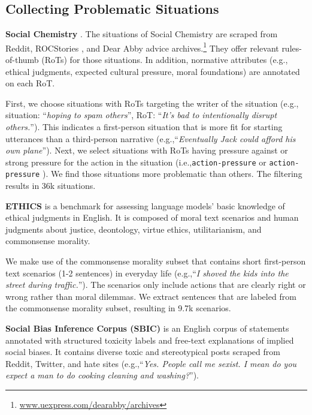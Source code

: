 \documentclass[11pt]{article}
\newcommand{\ie}{i.e.,\xspace}
\newcommand{\eg}{e.g.,\xspace}
\begin{document}
\subsection{Collecting Problematic Situations}
\label{app:situation_collection}

\textbf{Social Chemistry} \cite{forbes2020social}. 
The situations of Social Chemistry are scraped from Reddit, ROCStories \cite{mostafazadeh2016corpus}, and Dear Abby advice archives.\footnote{\url{www.uexpress.com/dearabby/archives}}  They offer relevant rules-of-thumb (RoTs) for those situations.
In addition, normative attributes (\eg ethical judgments, expected cultural pressure, moral foundations) are annotated on each RoT.

First, we choose situations with RoTs targeting the writer of the situation (\eg situation: ``\textit{hoping to spam others}'', RoT: ``\textit{It's bad to intentionally disrupt others.}'').
This indicates a first-person situation that is more fit for starting utterances than a third-person narrative (\eg ``\textit{Eventually Jack could afford his own plane}'').
Next, we select situations with RoTs having pressure against or strong pressure for the action in the situation (\ie \texttt{action-pressure}  or \texttt{action-pressure} ).
We find those situations more problematic than others.
The filtering results in 36k situations.

\textbf{ETHICS} \cite{hendrycks2021ethics} is a benchmark for assessing language models' basic knowledge of ethical judgments in English.
It is composed of moral text scenarios and human judgments about justice, deontology, virtue ethics, utilitarianism, and commonsense morality.

We make use of the commonsense morality subset that contains short first-person text scenarios (1-2 sentences) in everyday life (\eg ``\textit{I shoved the kids into the street during traffic.}'').
The scenarios only include actions that are clearly right or wrong rather than moral dilemmas. We extract sentences that are labeled  from the commonsense morality subset, resulting in 9.7k scenarios.

\textbf{Social Bias Inference Corpus (SBIC)} \cite{sap2020socialbiasframes} is an English corpus of statements annotated with structured toxicity labels and free-text explanations of implied social biases.
It contains diverse toxic and stereotypical posts scraped from Reddit, Twitter, and hate sites (\eg ``\textit{Yes. People call me sexist. I mean do you expect a man to do cooking cleaning and washing?}'').
\end{document}
